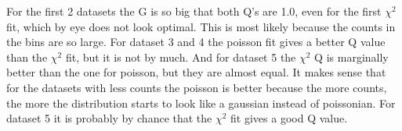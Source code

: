For the first 2 datasets the G is so big that both Q's are 1.0, even for the first $\chi^2$ fit, which by eye does not look optimal. This is most likely because the counts in the bins are so large. 
For dataset 3 and 4 the poisson fit gives a better Q value than the $\chi^2$ fit, but it is not by much. 
And for dataset 5 the $\chi^2$ Q is marginally better than the one for poisson, but they are almost equal. 
It makes sense that for the datasets with less counts the poisson is better because the more counts, the more the distribution starts to look like a gaussian instead of poissonian. For dataset 5 it is probably by chance that the $\chi^2$ fit gives a good Q value. 
